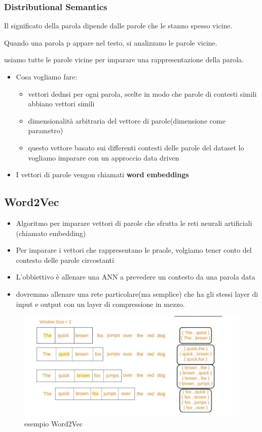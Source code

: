 \subsubsection{Distributional Semantics}
Il significato della parola dipende dalle parole che le stanno spesso vicine.

Quando una parola p appare nel testo, si analizzano le parole vicine.

usiamo tutte le parole vicine per imparare una rappresentazione della parola.

\begin{itemize}
    \item Cosa vogliamo fare:
    \begin{itemize}
        \item vettori dednsi per ogni parola, scelte in modo che parole di contesti simili
        abbiano vettori simili
        \item dimensionalità arbitraria del vettore di parole(dimensione come parametro)
        \item questo vettore basato sui differenti contesti delle parole del dataset lo
        vogliamo imparare con un approccio data driven
    \end{itemize}
    \item I vettori di parole vengon chiamati \textbf{word embeddings}
\end{itemize}

\subsection{Word2Vec}
\begin{itemize}
    \item Algoritmo per imparare vettori di parole che sfrutta le reti neurali artificiali
    (chiamato embedding)
    \item Per imparare i vettori che rappresentano le praole, volgiamo tener conto del contesto
    delle parole circostanti
    \item L'obbiettivo è allenare una ANN a prevedere un contesto da una parola data
    \item dovremmo allenare una rete particolare(ma semplice) che ha gli stessi layer di
    input e output con un layer di compressione in mezzo.
\end{itemize}

\begin{figure}[H]
    \centering
    \includegraphics[width=0.7\linewidth]{imgs/esempio-word2vec}
    \caption{esempio Word2Vec}
    \label{fig:esempio_Word2Vec}
\end{figure}


